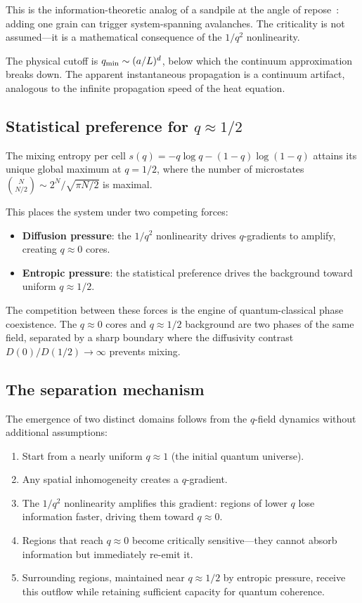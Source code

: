 \documentclass[reprint]{revtex4-2}
\begin{document}
This is the information-theoretic analog of a sandpile at the angle of repose~\cite{Bak1987}: adding one grain can trigger system-spanning avalanches. The criticality is not assumed---it is a mathematical consequence of the $1/q^2$ nonlinearity.

The physical cutoff is $q_{\rm min}\sim (a/L)^d$, below which the continuum approximation breaks down. The apparent instantaneous propagation is a continuum artifact, analogous to the infinite propagation speed of the heat equation.

\subsection{Statistical preference for $q\approx 1/2$}

The mixing entropy per cell $s(q) = -q\log q - (1-q)\log(1-q)$ attains its unique global maximum at $q=1/2$, where the number of microstates $\binom{N}{N/2}\sim 2^N/\sqrt{\pi N/2}$ is maximal.

This places the system under two competing forces:
\begin{itemize}
\item \textbf{Diffusion pressure}: the $1/q^2$ nonlinearity drives $q$-gradients to amplify, creating $q\approx 0$ cores.
\item \textbf{Entropic pressure}: the statistical preference drives the background toward uniform $q\approx 1/2$.
\end{itemize}

The competition between these forces is the engine of quantum-classical phase coexistence. The $q\approx 0$ cores and $q\approx 1/2$ background are two phases of the same field, separated by a sharp boundary where the diffusivity contrast $D(0)/D(1/2)\to\infty$ prevents mixing.

\subsection{The separation mechanism}

The emergence of two distinct domains follows from the $q$-field dynamics without additional assumptions:

\begin{enumerate}
\item Start from a nearly uniform $q\approx 1$ (the initial quantum universe).
\item Any spatial inhomogeneity creates a $q$-gradient.
\item The $1/q^2$ nonlinearity amplifies this gradient: regions of lower $q$ lose information faster, driving them toward $q\approx 0$.
\item Regions that reach $q\approx 0$ become critically sensitive---they cannot absorb information but immediately re-emit it.
\item Surrounding regions, maintained near $q\approx 1/2$ by entropic pressure, receive this outflow while retaining sufficient capacity for quantum coherence.
\end{enumerate}
\end{document}
